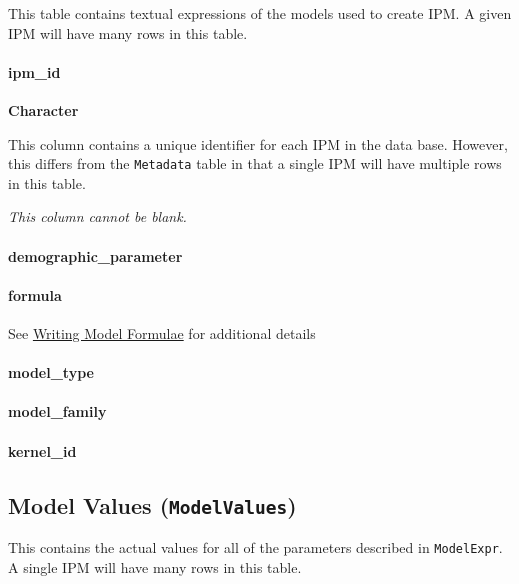 \documentclass[]{article}
\let\oldparagraph\paragraph
\renewcommand{\paragraph}[1]{\oldparagraph{#1}\mbox{}}
\begin{document}
This table contains textual expressions of the models used to create
IPM. A given IPM will have many rows in this table.

\paragraph{ipm\_id}\label{ipm_id-3}

\textbf{Character}

This column contains a unique identifier for each IPM in the data base.
However, this differs from the \texttt{Metadata} table in that a single
IPM will have multiple rows in this table.

\emph{This column cannot be blank.}

\paragraph{demographic\_parameter}\label{demographic_parameter}

\paragraph{formula}\label{formula}

See \protect\hyperlink{model-forms}{Writing Model Formulae} for
additional details

\paragraph{model\_type}\label{model_type}

\paragraph{model\_family}\label{model_family}

\paragraph{kernel\_id}\label{kernel_id}

\subsection{\texorpdfstring{Model Values
(\texttt{ModelValues})}{Model Values (ModelValues)}}\label{model-values-modelvalues}

This contains the actual values for all of the parameters described in
\texttt{ModelExpr}. A single IPM will have many rows in this table.
\end{document}
